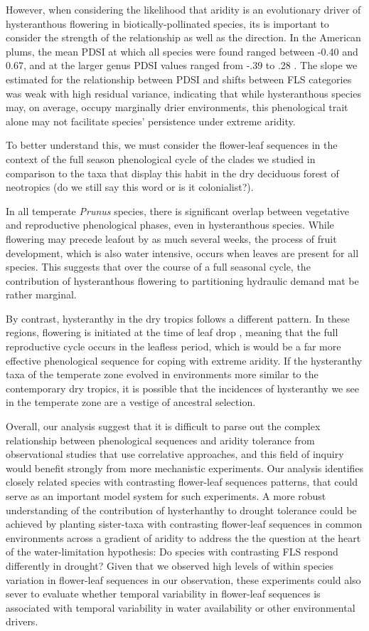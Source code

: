 \documentclass{article}[11pt]
\begin{document}
However, when considering the likelihood that aridity is an evolutionary driver of hysteranthous flowering in biotically-pollinated species, its is important to consider the strength of the relationship as well as the direction. In the American plums, the mean PDSI at which all species were found ranged between -0.40 and 0.67, and at the larger genus PDSI values ranged from -.39 to .28 . The slope we estimated for the relationship between PDSI and shifts between FLS categories was weak with high residual variance, indicating that while  hysteranthous species may, on average, occupy marginally drier environments, this phenological trait alone may not facilitate species' persistence under extreme aridity. 

To better understand this, we must consider the flower-leaf sequences in the context of the full season phenological cycle of the clades we studied in comparison to the taxa that display this habit in the dry deciduous forest of neotropics (do we still say this word or is it colonialist?).

In all temperate \textit{Prunus} species, there is significant overlap between vegetative and reproductive phenological phases, even in hysteranthous species. While flowering may precede leafout by as much several weeks, the process of fruit development, which is also water intensive, occurs when leaves are present for all species. This suggests that over the course of a full seasonal cycle, the contribution of hysteranthous flowering to partitioning hydraulic demand mat be rather marginal. 

By contrast, hysteranthy in the dry tropics follows a different pattern. In these regions, flowering is initiated at the time of leaf drop \citep{Borchert1983,Franklin2016}, meaning that the full reproductive cycle occurs in the leafless period, which is would be a far more effective phenological sequence for coping with extreme aridity. If the hysteranthy taxa of the temperate zone evolved in environments more similar to the contemporary dry tropics, it is possible that the incidences of hysteranthy we see in the temperate zone are a vestige of ancestral selection.

Overall, our analysis suggest that it is difficult to parse out the complex relationship between phenological sequences and aridity tolerance from observational studies that use correlative approaches, and this field of inquiry would benefit strongly from more mechanistic experiments. Our analysis identifies closely related species with contrasting flower-leaf sequences patterns, that could serve as an important model system for such experiments. A more robust understanding of the contribution of hysterhanthy to drought tolerance could be achieved by planting sister-taxa with contrasting flower-leaf sequences in common environments across a gradient of aridity to address the the question at the heart of the water-limitation hypothesis: Do species with contrasting FLS respond differently in drought? Given that we observed high levels of within species variation in flower-leaf sequences in our observation, these experiments could also sever to evaluate whether temporal variability in flower-leaf sequences is associated with temporal variability in water availability or other environmental drivers.
\end{document}
